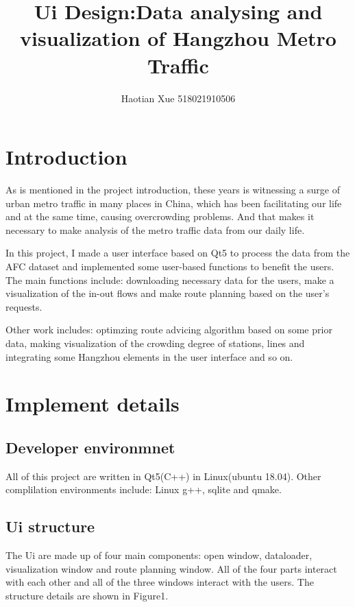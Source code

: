 \documentclass[transmag]{IEEEtran}
\begin{document}
\title{Ui Design:Data analysing and visualization of Hangzhou  Metro Traffic}

\author{Haotian Xue 518021910506}



\maketitle

\section{Introduction}
  As is mentioned in the project introduction, these years is witnessing a surge of urban
metro traffic in many places in China, which has been facilitating our life and at the same time, 
causing overcrowding problems. And that makes it necessary to make analysis of the metro traffic data 
from our daily life. 


  In this project, I made a user interface based on Qt5 to process the data from the AFC dataset and 
implemented some user-based functions to benefit the users. The main functions include: downloading
necessary data for the users, make a visualization of the in-out flows and make route planning based 
on the user's requests. 

Other work includes: optimzing route advicing algorithm based on some 
prior data, making visualization of the crowding degree of stations, lines and integrating some
Hangzhou elements in the user interface and so on.




\section{Implement details}
\subsection{Developer environmnet}
   All of this project are written in Qt5(C++) in Linux(ubuntu 18.04). Other complilation environments include:
   Linux g++, sqlite and qmake.

\subsection{Ui structure}
  The Ui are made up of four main components: 
  open window, dataloader,  visualization window and route planning window. 
  All of the four parts interact with each other and 
  all of the three windows interact with the users.
 The structure details are shown in Figure1.
\end{document}
